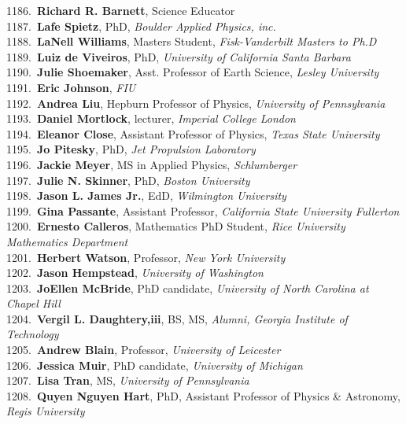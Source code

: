 1186.~{\bf Richard R. Barnett}, Science Educator \\
1187.~{\bf Lafe Spietz}, PhD, {\sl Boulder Applied Physics, inc.} \\
1188.~{\bf LaNell Williams}, Masters Student, {\sl Fisk-Vanderbilt Masters to Ph.D} \\
1189.~{\bf Luiz de Viveiros}, PhD, {\sl University of California Santa Barbara} \\
1190.~{\bf Julie Shoemaker}, Asst. Professor of Earth Science, {\sl Lesley University} \\
1191.~{\bf Eric Johnson}, {\sl FIU} \\
1192.~{\bf Andrea Liu}, Hepburn Professor of Physics, {\sl University of Pennsylvania} \\
1193.~{\bf Daniel Mortlock}, lecturer, {\sl Imperial College London} \\
1194.~{\bf Eleanor Close}, Assistant Professor of Physics, {\sl Texas State University} \\
1195.~{\bf Jo Pitesky}, PhD, {\sl Jet Propulsion Laboratory} \\
1196.~{\bf Jackie Meyer}, MS in Applied Physics, {\sl Schlumberger} \\
1197.~{\bf Julie N. Skinner}, PhD, {\sl Boston University} \\
1198.~{\bf Jason L. James Jr.}, EdD, {\sl Wilmington University } \\
1199.~{\bf Gina Passante}, Assistant Professor, {\sl California State University Fullerton} \\
1200.~{\bf Ernesto Calleros}, Mathematics PhD Student, {\sl Rice University Mathematics Department } \\
1201.~{\bf Herbert Watson}, Professor, {\sl New York University} \\
1202.~{\bf Jason Hempstead}, {\sl University of Washington} \\
1203.~{\bf JoEllen McBride}, PhD candidate, {\sl University of North Carolina  at Chapel Hill } \\
1204.~{\bf Vergil L. Daughtery,iii}, BS, MS, {\sl Alumni, Georgia Institute of Technology} \\
1205.~{\bf Andrew Blain}, Professor, {\sl University of Leicester} \\
1206.~{\bf Jessica Muir}, PhD candidate, {\sl University of Michigan} \\
1207.~{\bf Lisa Tran}, MS, {\sl University of Pennsylvania} \\
1208.~{\bf Quyen Nguyen Hart}, PhD, Assistant Professor of Physics \& Astronomy, {\sl Regis University} \\
